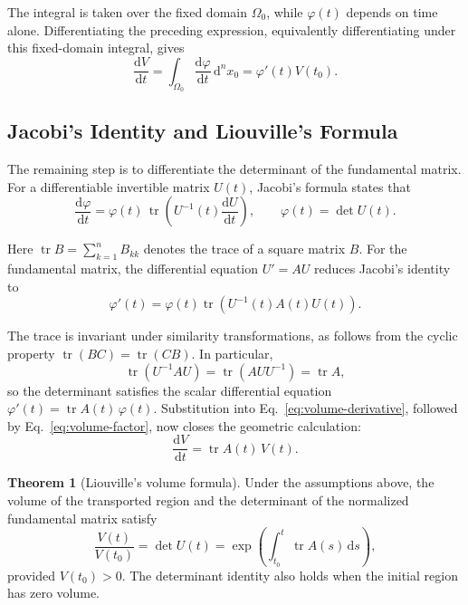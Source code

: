 \documentclass[10pt,a4paper]{article}
\newcommand{\dd}{\mathrm{d}}
\DeclareMathOperator{\tr}{tr}
\numberwithin{equation}{section}
\theoremstyle{definition}
\newtheorem{theorem}{Theorem}[section]
\begin{document}
The integral is taken over the fixed domain $\Omega_0$, while $\varphi(t)$ depends on time alone. Differentiating the preceding expression, equivalently differentiating under this fixed-domain integral, gives
\begin{equation}
\frac{\dd V}{\dd t}
=\int_{\Omega_0}\frac{\dd\varphi}{\dd t}\,\dd^n x_0
=\varphi'(t)V(t_0).
\label{eq:volume-derivative}
\end{equation}

\subsection{Jacobi's Identity and Liouville's Formula}

The remaining step is to differentiate the determinant of the fundamental matrix. For a differentiable invertible matrix $U(t)$, Jacobi's formula states that
\begin{equation}
\frac{\dd\varphi}{\dd t}
=\varphi(t)\,\tr\!\left(U^{-1}(t)\frac{\dd U}{\dd t}\right),
\qquad \varphi(t)=\det U(t).
\label{eq:jacobi}
\end{equation}

Here $\tr B=\sum_{k=1}^{n}B_{kk}$ denotes the trace of a square matrix $B$. For the fundamental matrix, the differential equation $U'=AU$ reduces Jacobi's identity to
\begin{equation}
\varphi'(t)=\varphi(t)\tr\!\left(U^{-1}(t)A(t)U(t)\right).
\label{eq:jacobi-application}
\end{equation}

The trace is invariant under similarity transformations, as follows from the cyclic property $\tr(BC)=\tr(CB)$. In particular,
\begin{equation}
\tr\!\left(U^{-1}AU\right)=\tr\!\left(AUU^{-1}\right)=\tr A,
\label{eq:trace-similarity}
\end{equation}
so the determinant satisfies the scalar differential equation $\varphi'(t)=\tr A(t)\,\varphi(t)$. Substitution into Eq.~\eqref{eq:volume-derivative}, followed by Eq.~\eqref{eq:volume-factor}, now closes the geometric calculation:
\begin{equation}
\frac{\dd V}{\dd t}=\tr A(t)\,V(t).
\label{eq:volume-evolution}
\end{equation}

\begin{theorem}[Liouville's volume formula]
Under the assumptions above, the volume of the transported region and the determinant of the normalized fundamental matrix satisfy
\begin{equation}
\frac{V(t)}{V(t_0)}=\det U(t)
=\exp\!\left(\int_{t_0}^{t}\tr A(s)\,\dd s\right),
\label{eq:liouville}
\end{equation}
provided $V(t_0)>0$. The determinant identity also holds when the initial region has zero volume.
\end{theorem}
\end{document}
